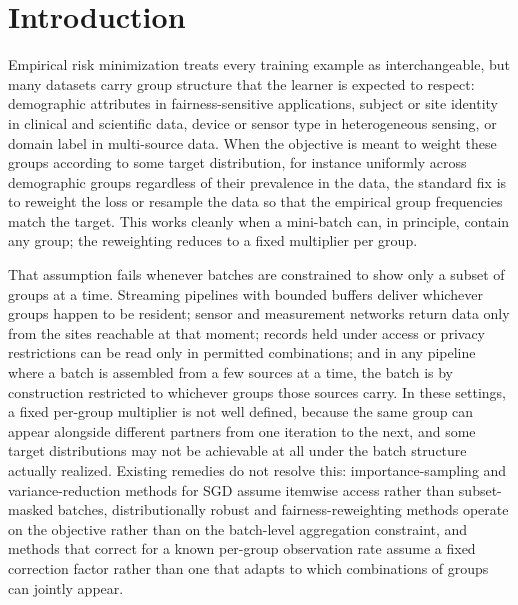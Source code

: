 \documentclass[9pt]{extarticle}
\theoremstyle{definition}
\begin{document}
\section{Introduction}

Empirical risk minimization treats every training example as interchangeable, but many datasets carry group structure that the learner is expected to respect: demographic attributes in fairness-sensitive applications, subject or site identity in clinical and scientific data, device or sensor type in heterogeneous sensing, or domain label in multi-source data. When the objective is meant to weight these groups according to some target distribution, for instance uniformly across demographic groups regardless of their prevalence in the data, the standard fix is to reweight the loss or resample the data so that the empirical group frequencies match the target. This works cleanly when a mini-batch can, in principle, contain any group; the reweighting reduces to a fixed multiplier per group.

That assumption fails whenever batches are constrained to show only a subset of groups at a time. Streaming pipelines with bounded buffers deliver whichever groups happen to be resident; sensor and measurement networks return data only from the sites reachable at that moment; records held under access or privacy restrictions can be read only in permitted combinations; and in any pipeline where a batch is assembled from a few sources at a time, the batch is by construction restricted to whichever groups those sources carry. In these settings, a fixed per-group multiplier is not well defined, because the same group can appear alongside different partners from one iteration to the next, and some target distributions may not be achievable at all under the batch structure actually realized. Existing remedies do not resolve this: importance-sampling and variance-reduction methods for SGD assume itemwise access rather than subset-masked batches, distributionally robust and fairness-reweighting methods operate on the objective rather than on the batch-level aggregation constraint, and methods that correct for a known per-group observation rate assume a fixed correction factor rather than one that adapts to which combinations of groups can jointly appear.
\end{document}
